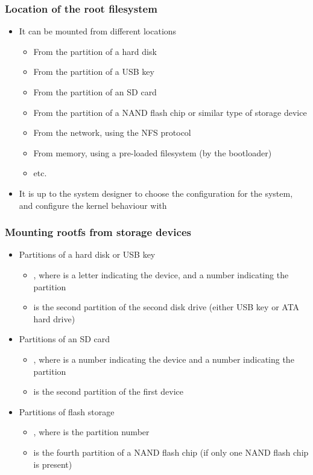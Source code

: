 \begin{frame}
  \frametitle{Location of the root filesystem}
  \begin{itemize}
  \item It can be mounted from different locations
    \begin{itemize}
    \item From the partition of a hard disk
    \item From the partition of a USB key
    \item From the partition of an SD card
    \item From the partition of a NAND flash chip or similar type of
      storage device
    \item From the network, using the NFS protocol
    \item From memory, using a pre-loaded filesystem (by the
      bootloader)
    \item etc.
    \end{itemize}
  \item It is up to the system designer to choose the configuration
    for the system, and configure the kernel behaviour with
  \end{itemize}
\end{frame}

\begin{frame}
  \frametitle{Mounting rootfs from storage devices}
  \begin{itemize}
  \item Partitions of a hard disk or USB key
    \begin{itemize}
    \item {}, where  is a letter indicating
      the device, and  a number indicating the partition
    \item {} is the second partition of the second disk
      drive (either USB key or ATA hard drive)
    \end{itemize}
  \item Partitions of an SD card
    \begin{itemize}
    \item {}, where  is a number
      indicating the device and  a number indicating the
      partition
    \item {} is the second partition of the first
      device
    \end{itemize}
  \item Partitions of flash storage
    \begin{itemize}
    \item {}, where  is the partition number
    \item {} is the fourth partition of a NAND
      flash chip (if only one NAND flash chip is present)
    \end{itemize}
  \end{itemize}
\end{frame}

